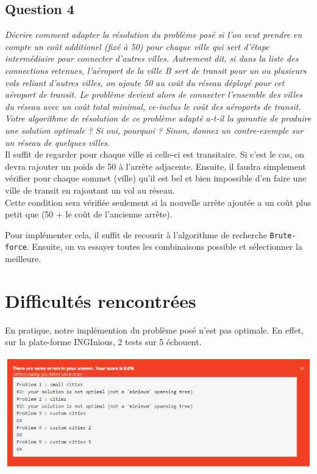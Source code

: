 \documentclass[11pt]{article}
\begin{document}
\subsection*{Question 4}
\textit{Décrire comment adapter la résolution du problème posé si l’on veut prendre
en compte un coût additionel (fixé à 50) pour chaque ville qui sert d’étape intermédiaire
pour connecter d’autres villes. Autrement dit, si dans la liste des
connections retenues, l’aéroport de la ville B sert de transit pour un ou plusieurs
vols reliant d’autres villes, on ajoute 50 au coût du réseau déployé pour cet aéroport
de transit. Le problème devient alors de connecter l’ensemble des villes du
réseau avec un coût total minimal, ce-inclus le coût des aéroports de transit.
Votre algorithme de résolution de ce problème adapté a-t-il la garantie de produire
une solution optimale ? Si oui, pourquoi ? Sinon, donnez un contre-exemple
sur un réseau de quelques villes.} \\ 

Il suffit de regarder pour chaque ville si celle-ci est transitaire. Si c'est le cas, on devra rajouter un poids de 50 à l'arrête adjacente. Ensuite, il faudra simplement vérifier pour chaque sommet (ville) qu'il est bel et bien impossible d'en faire une ville de transit en rajoutant un vol au réseau. \\
Cette condition sera vérifiée seulement si la nouvelle arrête ajoutée a un coût plus petit que (50 $+$ le coût de l'ancienne arrête).

Pour implémenter cela, il suffit de recourir à l'algorithme de recherche \verb+Brute-force+. Ensuite, on va essayer toutes les combinaisons possible et sélectionner la meilleure.



\section{Difficultés rencontrées}

En pratique, notre implémention du problème posé n'est pas optimale. En effet, sur la plate-forme INGInious, 2 tests sur 5 échouent.
\begin{center}
\includegraphics[scale=0.75]{fail.PNG}
\end{center}
\end{document}
